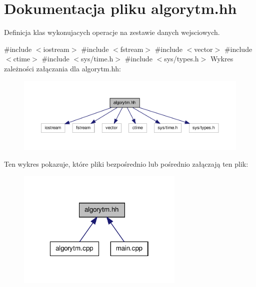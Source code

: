 \hypertarget{algorytm_8hh}{\section{\-Dokumentacja pliku algorytm.\-hh}
\label{algorytm_8hh}
}


\-Definicja klas wykonujacych operacje na zestawie danych wejsciowych.  


{\ttfamily \#include $<$iostream$>$}\*
{\ttfamily \#include $<$fstream$>$}\*
{\ttfamily \#include $<$vector$>$}\*
{\ttfamily \#include $<$ctime$>$}\*
{\ttfamily \#include $<$sys/time.\-h$>$}\*
{\ttfamily \#include $<$sys/types.\-h$>$}\*
\-Wykres zależności załączania dla algorytm.\-hh\-:
\nopagebreak
\begin{figure}[H]
\begin{center}
\leavevmode
\includegraphics[width=350pt]{algorytm_8hh__incl}
\end{center}
\end{figure}
\-Ten wykres pokazuje, które pliki bezpośrednio lub pośrednio załączają ten plik\-:
\nopagebreak
\begin{figure}[H]
\begin{center}
\leavevmode
\includegraphics[width=226pt]{algorytm_8hh__dep__incl}
\end{center}
\end{figure}
